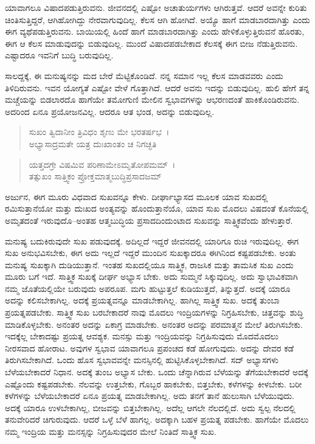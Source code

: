 ಯಾವಾಗಲೂ ವಿಷಾದಪಡುತ್ತಿರುವನು. ಜೀವನದಲ್ಲಿ ಎಷ್ಟೋ ಅಚಾತುರ್ಯಗಳು ಆಗಿರುತ್ತವೆ. ಆದರೆ ಅವನ್ನೇ ಕುರಿತು ಚಿಂತಿಸುತ್ತಿದ್ದರೆ, ಆಗಿಹೋಗಿದ್ದು ನೇರವಾಗುವುದಿಲ್ಲ. ಕೆಲಸ ಆಗಿ ಹೋಗಿದೆ. ಅಯ್ಯೊ ಹಾಗೆ ಮಾಡಬಾರದಾಗಿತ್ತು ಎಂದು ಈಗ ವ್ಯಥೆಪಡುತ್ತಿರುವನು. ಬಾಯಿಯಲ್ಲಿ ಹಿಂದೆ ಹಾಗೆ ಮಾಡಬಾರದಾಗಿತ್ತು ಎಂದು ಹೇಳಿಕೊಳ್ಳುತ್ತಿರುವನೆ ಹೊರತು, ಈಗ ಆ ಕೆಲಸ ಮಾಡುವುದನ್ನು ಬಿಡುವುದಿಲ್ಲ. ಮುಂದೆ ವಿಷಾದಪಡಬೇಕಾದ ಕೆಲಸಕ್ಕೆ ಈಗ ಬೀಜ ನೆಡುತ್ತಿರುವನು. ಎಷ್ಟಾದರೂ ಇವನಿಗೆ ಬುದ್ಧಿ ಬರುವುದಿಲ್ಲ.

ಸಾಲದ್ದಕ್ಕೆ, ಈ ಮನುಷ್ಯನನ್ನು ಮದ ಬೇರೆ ಮೆಟ್ಟಿಕೊಂಡಿದೆ. ನನ್ನ ಸಮಾನ ಇಲ್ಲ ಕೆಲಸ ಮಾಡವವರು ಎಂದು ತಿಳಿದಿರುವನು. ಇವನ ಯೋಗ್ಯತೆ ಎಷ್ಟೋ ವೇಳೆ ಗೊತ್ತಾಗಿದೆ. ಆದರೆ ಅವನು ಇದನ್ನು ಬಿಡುವುದಿಲ್ಲ. ಹುಲಿ ಹೇಗೆ ತನ್ನ ಮಚ್ಚೆಯನ್ನು ಬಿಡಲಾರದೊ ಹಾಗೆಯೇ ತಮೋಗುಣಿ ಮೇಲಿನ ಸ್ವಭಾವಗಳನ್ನು ಆಭರಣದಂತೆ ಹಾಕಿಕೊಂಡಿರುವನು. ಅದರಿಂದ ಏನೂ ಪ್ರಯೋಜನವಿಲ್ಲ. ಆದರೂ ಆತ ಭಂಡ, ಅದನ್ನು ಬಿಡುವುದಿಲ್ಲ.

\begin{verse}
ಸುಖಂ ತ್ವಿದಾನೀಂ ತ್ರಿವಿಧಂ ಶೃಣು ಮೇ ಭರತರ್ಷಭ~।\\ಅಭ್ಯಾಸಾದ್ರಮತೇ ಯತ್ರ ದುಃಖಾಂತಂ ಚ ನಿಗಚ್ಛತಿ 
\end{verse}

\begin{verse}
ಯತ್ತದಗ್ರೇ ವಿಷಮಿವ ಪರಿಣಾಮೇಽಮೃತೋಪಮಮ್~।\\ತತ್ಸುಖಂ ಸಾತ್ತ್ವಿಕಂ ಪ್ರೋಕ್ತಮಾತ್ಮಬುದ್ಧಿಪ್ರಸಾದಜಮ್ 
\end{verse}

{\small ಅರ್ಜುನ, ಈಗ ಮೂರು ವಿಧವಾದ ಸುಖವನ್ನೂ ಕೇಳು. ದೀರ್ಘಾಭ್ಯಾಸದ ಮೂಲಕ ಯಾವ ಸುಖದಲ್ಲಿ ರಮಿಸುತ್ತಾನೆಯೋ ಮತ್ತು ದುಃಖದ ಅಂತ್ಯವನ್ನು ಹೊಂದುತ್ತಾನೆಯೊ, ಯಾವ ಸುಖ ಮೊದಲು ವಿಷದಂತೆ ಕೊನೆಯಲ್ಲಿ ಅಮೃತದಂತೆ ಇರುವುದೊ--ಅಂತಹ ಆತ್ಮಬುದ್ಧಿಯ ಪ್ರಸಾದದಿಂದುಂಟಾದ ಸುಖವನ್ನು ಸಾತ್ತ್ವಿಕವೆಂದು ಹೇಳುತ್ತಾರೆ.}

ಮನುಷ್ಯ ಬದುಕಿರುವುದೇ ಸುಖ ಪಡುವುದಕ್ಕೆ. ಅದಿಲ್ಲದೆ ಇದ್ದರೆ ಜೀವನದಲ್ಲಿ ಯಾರಿಗೂ ರುಚಿ ಇರುವುದಿಲ್ಲ. ಈಗ ಸುಖ ಅನುಭವಿಸಬೇಕು, ಈಗ ಅದು ಇಲ್ಲದೆ ಇದ್ದರೆ ಮುಂದಿನ ಸುಖಕ್ಕಾದರೂ ಈಗಿನಿಂದ ಕಷ್ಟಪಡಬೇಕು. ಅಂತು ಮನುಷ್ಯ ಸುಖಕ್ಕಾಗಿ ದುಡಿಯುತ್ತಾನೆ. ಇಂತಹ ಸುಖದಲ್ಲಿಯೂ ಸಾತ್ತ್ವಿಕ, ರಾಜಸಿಕ ಮತ್ತು ತಾಮಸಿಕ ಸುಖ ಎಂದು ಮೂರು ಬಗೆ ಇದೆ. ಸಾತ್ತ್ವಿಕ ಸುಖಕ್ಕೆ ದೀರ್ಘ ಅಭ್ಯಾಸ ಬೇಕು. ಅದು ಸುಮ್ಮನೆ ಸಿಕ್ಕುವುದಿಲ್ಲ. ಅದು ಸ್ವಾಭಾವಿಕವಾಗಿ ನಮ್ಮ ಜೊತೆಯಲ್ಲಿಯೇ ಬರುವುದು ಅಪರೂಪ. ಮಗು ಹುಟ್ಟುತ್ತಲೆ ಕುಡಿಯುತ್ತದೆ, ತಿನ್ನುತ್ತದೆ. ಅದಕ್ಕೆ ಯಾರೂ ಅದನ್ನು ಕಲಿಸಬೇಕಾಗಿಲ್ಲ. ಅದಕ್ಕೆ ಪ್ರಯತ್ನವನ್ನೂ ಮಾಡಬೇಕಾಗಿಲ್ಲ. ಹಾಗಿಲ್ಲ ಸಾತ್ತ್ವಿಕ ಸುಖ. ಅದಕ್ಕೆ ತುಂಬಾ ಪ್ರಯತ್ನಪಡಬೇಕು. ಸಾತ್ತ್ವಿಕ ಸುಖ ಬರಬೇಕಾದರೆ ನಾವು ಮೊದಲು ಇಂದ್ರಿಯಗಳನ್ನು ನಿಗ್ರಹಿಸಬೇಕು, ಚಿತ್ತವನ್ನು ಶುದ್ಧಿ ಮಾಡಿಕೊಳ್ಳಬೇಕು. ಅನಂತರ ಅದನ್ನು ಏಕಾಗ್ರ ಮಾಡಬೇಕು. ಅನಂತರ ಅದನ್ನು ಪರಮಾತ್ಮನ ಮೇಲೆ ತಿರುಗಿಸಬೇಕು. ಇದಕ್ಕೆಲ್ಲ ಬೇಕಾದಷ್ಟು ಪ್ರಯತ್ನ ಆವಶ್ಯಕ. ಮನಸ್ಸು ಮತ್ತು ಇಂದ್ರಿಯವನ್ನು ನಿಗ್ರಹಿಸುವುದು ಮೊದಮೊದಲು ನೀರಸವಾದ ಹೋರಾಟ. ಅವುಗಳ ಸ್ವಭಾವ ಯಾವಾಗಲೂ ಪ್ರಪಂಚದ ಕಡೆ ಹೋಗುವುದು. ಅದನ್ನು ದೇವರ ಕಡೆ ತಿರುಗಿಸಬೇಕಾಗಿದೆ. ಒಂದು ಹೊಸ ಸ್ವಭಾವವನ್ನೇ ಮನಸ್ಸಿನಲ್ಲಿ ಹುಟ್ಟಿಸಿಕೊಳ್ಳಬೇಕಾಗಿದೆ. ಸದ್ ಅಭ್ಯಾಸಗಳು ಬೆಳೆಯಬೇಕಾದರೆ ನಿಧಾನ. ಅದಕ್ಕೆ ತುಂಬ ಅಭ್ಯಾಸ ಬೇಕು. ಒಂದು ಚೆನ್ನಾಗಿರುವ ಬೆಳೆಯನ್ನು ತೆಗೆಯಬೇಕಾದರೆ ಅದಕ್ಕೆ ಎಷ್ಟೊಂದು ಕಷ್ಟಪಡಬೇಕು. ನೆಲವನ್ನು ಉತ್ತಬೇಕು, ಗೊಬ್ಬರ ಹಾಕಬೇಕು, ಬಿತ್ತಬೇಕು, ಕಳೆಗಳನ್ನು ಕೀಳಬೇಕು. ಬರೀ ಕಳೆಗಳನ್ನು ಬೆಳೆಯಬೇಕಾದರೆ ಏನೂ ಪ್ರಯತ್ನ ಮಾಡಬೇಕಾಗಿಲ್ಲ. ಅದು ತನಗೆ ತಾನೆ ಹುಲುಸಾಗಿ ಬೆಳೆಯುವುದು. ಅದಕ್ಕೆ ಯಾರೂ ಉಳಬೇಕಾಗಿಲ್ಲ, ಬೀಜವನ್ನು ಬಿತ್ತಬೇಕಾಗಿಲ್ಲ. ಅದೆಲ್ಲ ಆಗಲೇ ನೆಲದಲ್ಲಿದೆ. ಅದು ಸ್ವಲ್ಪ ನೆಲದಲ್ಲಿ ತನುವೇರಿದರೆ ಚಿಗುರುವುದು. ಆದರೆ ಒಳ್ಳೆ ಬೆಳೆ ಹಾಗಲ್ಲ. ಅದಕ್ಕಾಗಿ ಬಹಳ ಪ್ರಯತ್ನ ಪಡಬೇಕು. ಹಾಗೆಯೇ ಮೊದಲು ನಮ್ಮ ಇಂದ್ರಿಯ ಮತ್ತು ಮನಸ್ಸನ್ನು ನಿಗ್ರಹಿಸುವುದರ ಮೇಲೆ ನಿಂತಿದೆ ಸಾತ್ತ್ವಿಕ ಸುಖ.

